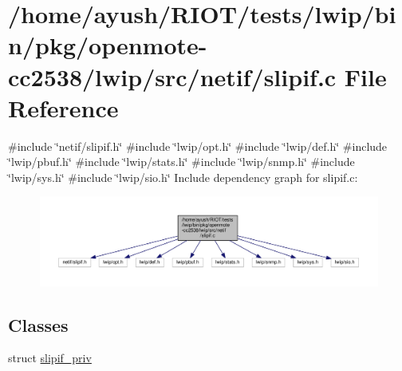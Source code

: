 \hypertarget{openmote-cc2538_2lwip_2src_2netif_2slipif_8c}{}\section{/home/ayush/\+R\+I\+O\+T/tests/lwip/bin/pkg/openmote-\/cc2538/lwip/src/netif/slipif.c File Reference}
\label{openmote-cc2538_2lwip_2src_2netif_2slipif_8c}
{\ttfamily \#include \char`\"{}netif/slipif.\+h\char`\"{}}\newline
{\ttfamily \#include \char`\"{}lwip/opt.\+h\char`\"{}}\newline
{\ttfamily \#include \char`\"{}lwip/def.\+h\char`\"{}}\newline
{\ttfamily \#include \char`\"{}lwip/pbuf.\+h\char`\"{}}\newline
{\ttfamily \#include \char`\"{}lwip/stats.\+h\char`\"{}}\newline
{\ttfamily \#include \char`\"{}lwip/snmp.\+h\char`\"{}}\newline
{\ttfamily \#include \char`\"{}lwip/sys.\+h\char`\"{}}\newline
{\ttfamily \#include \char`\"{}lwip/sio.\+h\char`\"{}}\newline
Include dependency graph for slipif.\+c\+:
\nopagebreak
\begin{figure}[H]
\begin{center}
\leavevmode
\includegraphics[width=350pt]{openmote-cc2538_2lwip_2src_2netif_2slipif_8c__incl}
\end{center}
\end{figure}
\subsection*{Classes}
\begin{DoxyCompactItemize}
\item 
struct \hyperlink{structslipif__priv}{slipif\+\_\+priv}
\end{DoxyCompactItemize}
